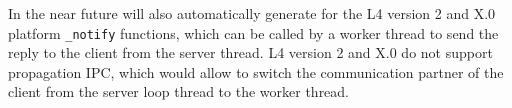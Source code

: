 In the near future \dice{} will also automatically generate for the
L4 version 2 and X.0 platform \verb|_notify| functions, which can be called
by a worker thread to send the reply to the client from the server thread.
L4 version 2 and X.0 do not support propagation IPC, which would allow to
switch the communication partner of the client from the server loop thread
to the worker thread.

